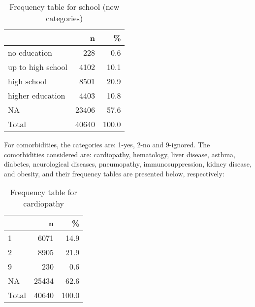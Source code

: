 \documentclass[
]{article}
\newenvironment{Shaded}{\begin{snugshade}}{\end{snugshade}}
\newcommand{\DataTypeTok}[1]{\textcolor[rgb]{0.13,0.29,0.53}{#1}}
\newcommand{\DecValTok}[1]{\textcolor[rgb]{0.00,0.00,0.81}{#1}}
\newcommand{\KeywordTok}[1]{\textcolor[rgb]{0.13,0.29,0.53}{\textbf{#1}}}
\newcommand{\NormalTok}[1]{#1}
\newcommand{\OperatorTok}[1]{\textcolor[rgb]{0.81,0.36,0.00}{\textbf{#1}}}
\newcommand{\OtherTok}[1]{\textcolor[rgb]{0.56,0.35,0.01}{#1}}
\newcommand{\StringTok}[1]{\textcolor[rgb]{0.31,0.60,0.02}{#1}}
\begin{document}
\begin{table}[!h]

\caption{\label{tab:unnamed-chunk-28}Frequency table for school (new categories)}
\centering
\begin{tabular}[t]{l|r|r}
\hline
  & n & \%\\
\hline
no education & 228 & 0.6\\
\hline
up to high school & 4102 & 10.1\\
\hline
high school & 8501 & 20.9\\
\hline
higher education & 4403 & 10.8\\
\hline
NA & 23406 & 57.6\\
\hline
Total & 40640 & 100.0\\
\hline
\end{tabular}
\end{table}

For comorbidities, the categories are: 1-yes, 2-no and 9-ignored. The
comorbidities considered are: cardiopathy, hematology, liver disease,
asthma, diabetes, neurological diseases, pneumopathy, immunosuppression,
kidney disease, and obesity, and their frequency tables are presented
below, respectively:

\begin{Shaded}
\end{Shaded}

\begin{table}[!h]

\caption{\label{tab:unnamed-chunk-29}Frequency table for cardiopathy}
\centering
\begin{tabular}[t]{l|r|r}
\hline
  & n & \%\\
\hline
1 & 6071 & 14.9\\
\hline
2 & 8905 & 21.9\\
\hline
9 & 230 & 0.6\\
\hline
NA & 25434 & 62.6\\
\hline
Total & 40640 & 100.0\\
\hline
\end{tabular}
\end{table}
\end{document}
